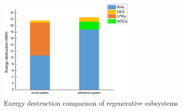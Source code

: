 \documentclass[preprint,12pt]{elsarticle}
\begin{document}



\begin{figure}[htbp]
\centering
\includegraphics[width=0.6\textwidth]{fig/regenerative_subsys_compare.png}
\caption{Exergy destruction comparison of regenerative subsystems} 
\label{fig:regenerative_subsys_compare}
\end{figure}
\end{document}
